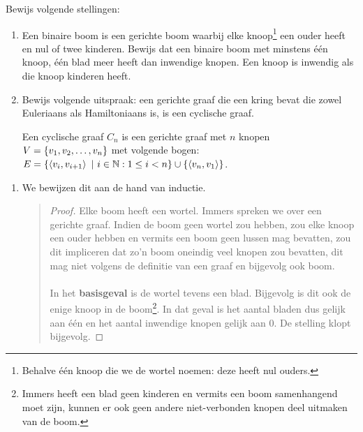 \documentclass{article}
\begin{document}
\begin{question}[Grafentheorie]
Bewijs volgende stellingen:
\begin{enumerate}
\item Een binaire boom is een gerichte boom waarbij elke knoop\footnote{Behalve \'e\'en knoop die we de wortel noemen: deze heeft nul ouders.} een
ouder heeft en nul of twee kinderen. Bewijs dat een binaire boom met
minstens \'e\'en knoop, \'e\'en blad meer heeft dan inwendige knopen.
Een knoop is inwendig als die knoop kinderen heeft.

\item Bewijs volgende uitspraak: een gerichte graaf die een kring
bevat die zowel Euleriaans als Hamiltoniaans is, is een cyclische
graaf.
  \begin{definition}
   Een cyclische graaf $C_n$ is een gerichte graaf met $n$ knopen $V=\left\{ v_1,v_2,\ldots,v_n \right\}$ met volgende bogen: $E=\left\{ \left\langle v_i,v_{i+1} \right\rangle\ |\ i\in\mathbb{N}:1\leq i< n \right\}\cup\left\{ \left\langle v_n,v_1 \right\rangle \right\}$.
  \end{definition}
\end{enumerate}
\begin{answer}
\begin{enumerate}
 \item We bewijzen dit aan de hand van inductie.
 \begin{quote}\begin{proof}
  Elke boom heeft een wortel. Immers spreken we over een gerichte graaf. Indien de boom geen wortel zou hebben, zou elke knoop een ouder hebben en vermits een boom geen lussen mag bevatten, zou dit impliceren dat zo'n boom oneindig veel knopen zou bevatten, dit mag niet volgens de definitie van een graaf en bijgevolg ook boom.
  \paragraph{}
  In het \textbf{basisgeval} is de wortel tevens een blad. Bijgevolg is dit ook de enige knoop in de boom\footnote{Immers heeft een blad geen kinderen en vermits een boom samenhangend moet zijn, kunnen er ook geen andere niet-verbonden knopen deel uitmaken van de boom.}. In dat geval is het aantal bladen dus gelijk aan \'e\'en en het aantal inwendige knopen gelijk aan $0$. De stelling klopt bijgevolg.

\end{proof}
\end{quote}
\end{enumerate}
\end{answer}
\end{question}
\end{document}
